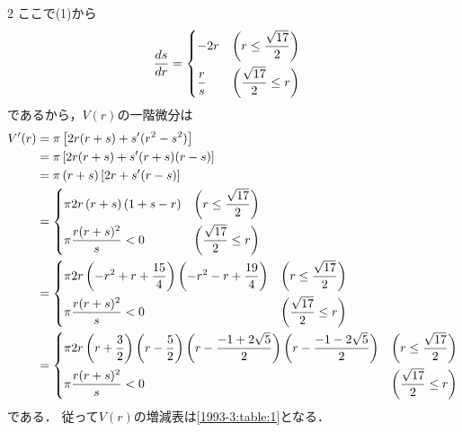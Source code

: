 \documentclass[../../../../main.tex]{subfiles}
\begin{document}
\begin{multicols}{2}
  ここで(1)から
  \begin{align*}
    \frac{ds}{dr} & =
    \begin{dcases}
      -2r         & \left(r \le \frac{\sqrt{17}}{2}\right)  \\
      \frac{r}{s} & \left(\frac{\sqrt{17}}{2} \le r \right)
    \end{dcases}
  \end{align*}
  であるから，$V(r)$の一階微分は
  \begin{align*}
    V'(r)
     & = \pi \left[ 2r(r+s)+s'(r^2-s^2) \right]                                                                                                                                                                                                                                     \\
     & = \pi \left[ 2r(r+s)+s'(r+s)(r-s) \right]                                                                                                                                                                                                                                    \\
     & = \pi \left(r+s\right)\left[ 2r+s'(r-s) \right]                                                                                                                                                                                                                              \\
     & = \begin{dcases}
           \pi 2r \left(r+s\right)\left( 1 + s - r \right) & \left(r \le \frac{\sqrt{17}}{2}\right)  \\
           \pi \frac{r(r+s)^2}{s} < 0                      & \left(\frac{\sqrt{17}}{2} \le r \right)
         \end{dcases}                                                                                                                                                    \\
     & = \begin{dcases}
           \pi 2r\left(-r^2+r+\frac{15}{4}\right)\left(-r^2-r+\frac{19}{4}\right) & \left(r \le \frac{\sqrt{17}}{2}\right)  \\
           \pi \frac{r(r+s)^2}{s} < 0                                             & \left(\frac{\sqrt{17}}{2} \le r \right)
         \end{dcases}                                                                                                                             \\
     & = \begin{dcases}
           \pi 2r\left(r+\frac{3}{2}\right)\left(r-\frac{5}{2}\right)\left(r-\frac{-1+2\sqrt{5}}{2}\right)\left(r-\frac{-1-2\sqrt{5}}{2}\right) & \left(r \le \frac{\sqrt{17}}{2}\right)  \\
           \pi \frac{r(r+s)^2}{s} < 0                                                                                                           & \left(\frac{\sqrt{17}}{2} \le r \right)
         \end{dcases}
  \end{align*}
  である．
  従って$V(r)$の増減表は\cref{1993-3:table:1}となる．


\end{multicols}
\end{document}
